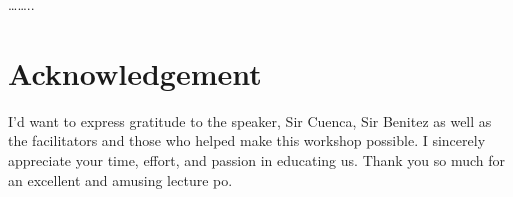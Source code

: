\documentclass[
]{article}
\begin{document}
\ldots\ldots..

\hypertarget{acknowledgement}{%
\section{Acknowledgement}\label{acknowledgement}}

I'd want to express gratitude to the speaker, Sir Cuenca, Sir Benitez as
well as the facilitators and those who helped make this workshop
possible. I sincerely appreciate your time, effort, and passion in
educating us. Thank you so much for an excellent and amusing lecture po.
\end{document}
